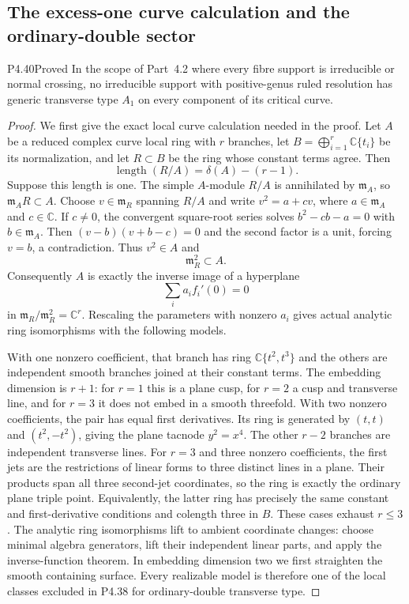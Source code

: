 \subsection{The excess-one curve calculation and the ordinary-double sector}

\begin{statement}{P4.40}{Proved}
In the scope of Part~4.2 where every fibre support is
irreducible or normal crossing, no irreducible support with
positive-genus ruled resolution has generic transverse type
$A_1$ on every component of its critical curve.
\end{statement}
\begin{proof}
We first give the exact local curve calculation needed in
the proof. Let $A$ be a reduced complex curve local ring with
$r$ branches, let $B=\bigoplus_{i=1}^r\mathbb C\{t_i\}$
be its normalization, and let $R\subset B$ be the ring whose
constant terms agree. Then
\[
 \operatorname{length}(R/A)=\delta(A)-(r-1).
\]
Suppose this length is one. The simple $A$-module $R/A$
is annihilated by $\mathfrak m_A$, so
$\mathfrak m_A R\subset A$. Choose
$v\in\mathfrak m_R$ spanning $R/A$ and write
$v^2=a+cv$, where $a\in\mathfrak m_A$ and $c\in\mathbb C$.
If $c\ne0$, the convergent square-root series solves
$b^2-cb-a=0$ with $b\in\mathfrak m_A$. Then
$(v-b)(v+b-c)=0$ and the second factor is a unit, forcing
$v=b$, a contradiction. Thus $v^2\in A$ and
\[
                         \mathfrak m_R^2\subset A.
\]
Consequently $A$ is exactly the inverse image of a hyperplane
\[
                         \sum_i a_i f_i'(0)=0
\]
in $\mathfrak m_R/\mathfrak m_R^2=\mathbb C^r$.
Rescaling the parameters with nonzero $a_i$ gives actual
analytic ring isomorphisms with the following models.

With one nonzero coefficient, that branch has ring
$\mathbb C\{t^2,t^3\}$ and the others are independent smooth
branches joined at their constant terms. The embedding
dimension is $r+1$: for $r=1$ this is a plane cusp, for
$r=2$ a cusp and transverse line, and for $r=3$ it does
not embed in a smooth threefold. With two nonzero
coefficients, the pair has equal first derivatives. Its
ring is generated by $(t,t)$ and $(t^2,-t^2)$, giving the
plane tacnode $y^2=x^4$. The other $r-2$ branches are
independent transverse lines. For $r=3$ and three nonzero
coefficients, the first jets are the restrictions of linear
forms to three distinct lines in a plane. Their products
span all three second-jet coordinates, so the ring is
exactly the ordinary plane triple point. Equivalently,
the latter ring has precisely the same constant and
first-derivative conditions and colength three in $B$.
These cases exhaust $r\le3$. The analytic ring
isomorphisms lift to ambient coordinate changes: choose
minimal algebra generators, lift their independent linear
parts, and apply the inverse-function theorem. In embedding
dimension two we first straighten the smooth containing
surface. Every realizable model is therefore one of the
local classes excluded in P4.38 for ordinary-double
transverse type.


\end{proof}
